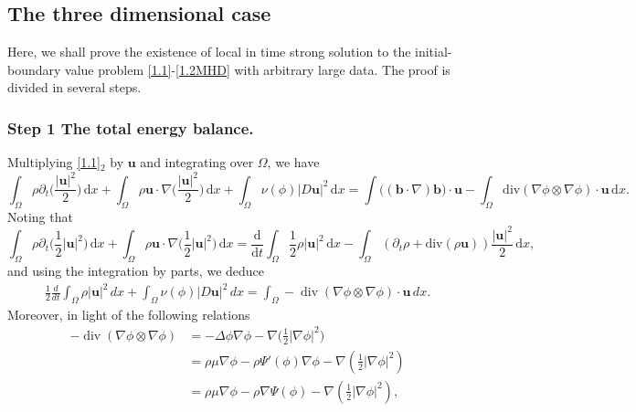 \documentclass[11pt]{article}
\numberwithin{equation}{section}
\begin{document}
\subsection{The three  dimensional case}
Here,  we shall prove the existence of local in time  strong solution  to the initial-boundary value problem
	\eqref{1.1}-\eqref{1.2MHD} with   arbitrary
large data. The proof is divided in several steps.
\subsubsection*{Step 1 The total energy balance.}
Multiplying \eqref{1.1}$_{2}$ by \(\mathbf{u}\) and integrating over \(\Omega\), we have
\begin{equation}
\int_{\Omega} \rho\partial_t \Big(\frac{\vert\mathbf{u}\vert^2}{2}\Big)\,\mathrm{d}x + \int_{\Omega} \rho\mathbf{u}\cdot\nabla \Big(\frac{\vert\mathbf{u}\vert^2}{2}\Big)\,\mathrm{d}x + \int_{\Omega} \nu(\phi)\vert D\mathbf{u}\vert^2\,\mathrm{d}x = \int \big((\mathbf{b}\cdot\nabla) \mathbf{b}\big)\cdot \mathbf{u}-\int_{\Omega} \text{div}(\nabla\phi\otimes\nabla\phi)\cdot\mathbf{u}\,\mathrm{d}x.
\end{equation}
Noting that
\begin{equation}
\int_{\Omega} \rho\partial_t \Big(\frac{1}{2}\vert\mathbf{u}\vert^2\Big)\,\mathrm{d}x + \int_{\Omega} \rho\mathbf{u}\cdot\nabla \Big(\frac{1}{2}\vert\mathbf{u}\vert^2\Big)\,\mathrm{d}x= \frac{\mathrm{d}}{\mathrm{d}t}\int_{\Omega} \frac{1}{2}\rho\vert\mathbf{u}\vert^2\,\mathrm{d}x - \int_{\Omega} (\partial_t\rho + \text{div}(\rho\mathbf{u}))\frac{\vert\mathbf{u}\vert^2}{2}\,\mathrm{d}x,
\end{equation}
and  using the integration by parts, we deduce
\begin{align*}
\frac{1}{2} \frac{d}{dt} \int_{\Omega} \rho |\mathbf{u}|^2 \, dx + \int_{\Omega} \nu(\phi) |D \mathbf{u}|^2 \, dx = \int_{\Omega} - \operatorname{div}(\nabla \phi \otimes \nabla \phi) \cdot\mathbf{u} \, dx.
\end{align*}
Moreover, in light of the  following relations
\begin{align*}
- \operatorname{div}(\nabla \phi \otimes \nabla \phi) &= - \Delta \phi \nabla \phi - \nabla \big( \frac{1}{2} |\nabla \phi|^2 \big) \\
&= \rho \mu \nabla \phi - \rho \Psi'(\phi) \nabla \phi - \nabla \left( \frac{1}{2} |\nabla \phi|^2 \right) \\
&= \rho \mu \nabla \phi - \rho \nabla \Psi(\phi) - \nabla \left( \frac{1}{2} |\nabla \phi|^2 \right),
\end{align*}
\end{document}
